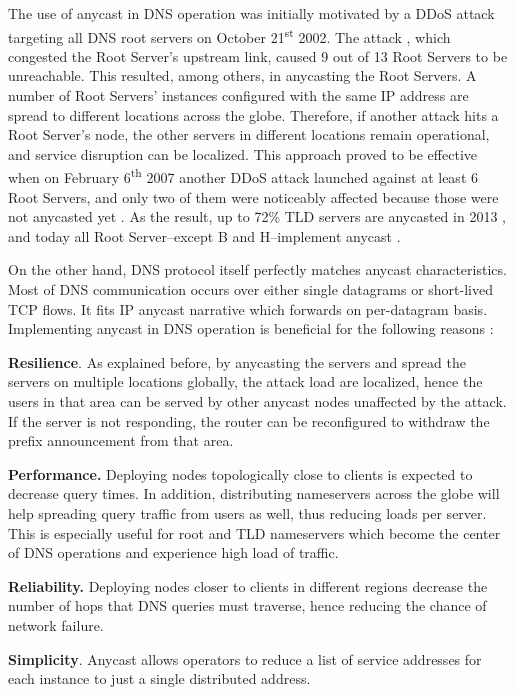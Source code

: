 The use of anycast in DNS operation was initially motivated by a DDoS attack targeting all DNS root servers on October 21\textsuperscript{st} 2002. The attack \cite{site:21oct}, which congested the Root Server's upstream link, caused 9 out of 13 Root Servers to be unreachable. This resulted, among others, in anycasting the Root Servers. A number of Root Servers' instances configured with the same IP address are spread to different locations across the globe. Therefore, if another attack hits a Root Server's node, the other servers in different locations remain operational, and service disruption can be localized. This approach proved to be effective when on February 6\textsuperscript{th} 2007 another DDoS attack launched against at least 6 Root Servers, and only two of them were noticeably affected because those were not anycasted yet \cite{site:icann-fact}. As the result, up to 72\% TLD servers are anycasted in 2013 \cite{6566965}, and today all Root Server--except B and H--implement anycast \cite{site:root-servers}. 

On the other hand, DNS protocol itself perfectly matches anycast characteristics. Most of DNS communication occurs over either single datagrams or short-lived TCP flows. It fits IP anycast narrative which forwards on per-datagram basis. Implementing anycast in DNS operation is beneficial for the following reasons \cite{colitti2006evaluating,rfc4786}:

\begin{description}
	\setlength{\itemsep}{1pt}
	\setlength{\parskip}{0pt}
	\setlength{\parsep}{0pt}
	\item \textbf{Resilience}. As explained before, by anycasting the servers and spread the servers on multiple locations globally, the attack load are localized, hence the users in that area can be served by other anycast nodes unaffected by the attack. If the server is not responding, the router can be reconfigured to withdraw the prefix announcement from that area.
	\item \textbf{Performance.} Deploying nodes topologically close to clients is expected to decrease query times. In addition, distributing nameservers across the globe will help spreading query traffic from users as well, thus reducing loads per server. This is especially useful for root and TLD nameservers which become the center of DNS operations and experience high load of traffic.
	\item \textbf{Reliability.} Deploying nodes closer to clients in different regions decrease the number of hops that DNS queries must traverse, hence reducing the chance of network failure. 
	\item \textbf{Simplicity}. Anycast allows operators to reduce a list of service addresses for each instance to just a single distributed address. 
\end{description}

